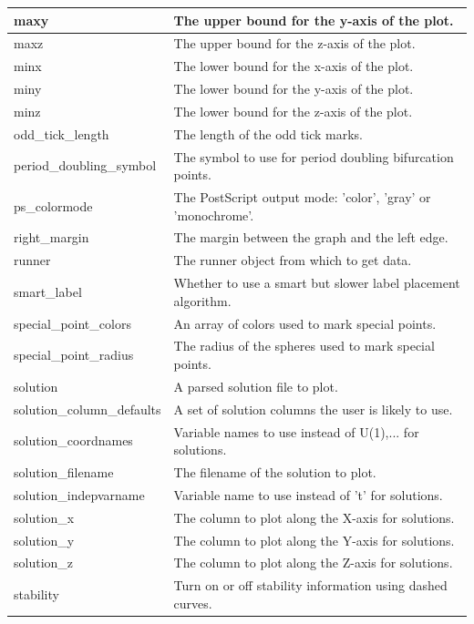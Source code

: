 \documentclass[12pt]{report}
\begin{document}
\begin{longtable}{| l | l |}
 \hline
 maxy  & The upper bound for the y-axis of the plot. \\
 \hline
 maxz  & The upper bound for the z-axis of the plot. \\
 \hline
 minx  &  The lower bound for the x-axis of the plot. \\
 \hline
 miny  & The lower bound for the y-axis of the plot. \\
 \hline
 minz  & The lower bound for the z-axis of the plot. \\
 \hline
 odd\_tick\_length  & The length of the odd tick marks. \\
 \hline
 period\_doubling\_symbol  &   The symbol to use for period doubling bifurcation points. \\ 
 \hline
 ps\_colormode  & The PostScript output mode: 'color', 'gray' or 'monochrome'. \\ 
 \hline
 right\_margin  & The margin between the graph and the left edge. \\
 \hline
 runner  &  The runner object from which to get data. \\       
 \hline
 smart\_label  & Whether to use a smart but slower label placement algorithm. \\ 
 \hline
 special\_point\_colors  &    An array of colors used to mark special points. \\ 
 \hline
 special\_point\_radius  &    The radius of the spheres used to mark special points. \\ 
 \hline
 solution  &  A parsed solution file to plot. \\
 \hline
 solution\_column\_defaults  & A set of solution columns the user is likely to use.\\
 \hline
 solution\_coordnames & Variable names to use instead of U(1),... for solutions. \\
 \hline
 solution\_filename  & The filename of the solution to plot. \\
 \hline
 solution\_indepvarname & Variable name to use instead of 't' for solutions. \\
 \hline
 solution\_x  &  The column to plot along the X-axis for solutions. \\
 \hline
 solution\_y  & The column to plot along the Y-axis for solutions. \\
 \hline
 solution\_z  & The column to plot along the Z-axis for solutions. \\
 \hline
 stability  & Turn on or off stability information using dashed curves. \\

\end{longtable}
\end{document}
